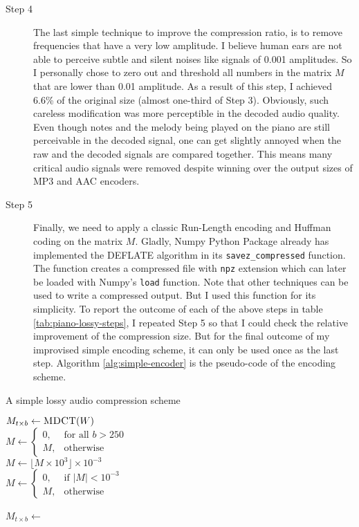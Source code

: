 \begin{description}
    \item[Step 4] The last simple technique to improve the compression ratio, is to remove frequencies that have a very low amplitude. I believe human ears are not able to perceive subtle and silent noises like signals of 0.001 amplitudes. So I personally chose to zero out and threshold all numbers in the matrix $M$ that are lower than 0.01 amplitude. As a result of this step, I achieved 6.6\% of the original size (almost one-third of Step 3). Obviously, such careless modification was more perceptible in the decoded audio quality. Even though notes and the melody being played on the piano are still perceivable in the decoded signal, one can get slightly annoyed when the raw and the decoded signals are compared together. This means many critical audio signals were removed despite winning over the output sizes of MP3 and AAC encoders.
    
    \item[Step 5] Finally, we need to apply a classic Run-Length encoding and Huffman coding on the matrix $M$. Gladly, Numpy Python Package\cite{harris2020array} already has implemented the DEFLATE algorithm in its \verb|savez_compressed| function. The function creates a compressed file with \verb|npz| extension which can later be loaded with Numpy's \verb|load| function. Note that other techniques can be used to write a compressed output. But I used this function for its simplicity. To report the outcome of each of the above steps in table \ref{tab:piano-lossy-steps}, I repeated Step 5 so that I could check the relative improvement of the compression size. But for the final outcome of my improvised simple encoding scheme, it can only be used once as the last step. Algorithm \ref{alg:simple-encoder} is the pseudo-code of the encoding scheme.
\end{description}

\begin{algorithm}
\caption{A simple lossy audio compression scheme}\label{alg:simple-encoder}
\begin{algorithmic}
\State $M_{t \times b} \gets \Call{MDCT}{W}$ 
\\
\State $M \gets \begin{cases}
0 , & \text{for all $b>250$} \\
M , & \text{otherwise}
\end{cases}$ 
\\
\State $M \gets \lfloor M \times 10^3 \rfloor \times 10^{-3}$ 
\\
\State $M \gets \begin{cases}
0 , & \text{if $|M|<10^{-3}$} \\
M , & \text{otherwise}
\end{cases}$ 
\\
\State \Return {}
\EndFunction
\\
\State $M_{t \times b} \gets$ 
\State \Return {}
\EndFunction
\end{algorithmic}
\end{algorithm}

